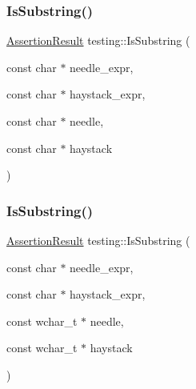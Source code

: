\mbox{\label{namespacetesting_a390c4f66fe7e9098117eb77e5fffa4ad}} 
\subsubsection{\texorpdfstring{Is\+Substring()}{IsSubstring()}\hspace{0.1cm}{\footnotesize\ttfamily [1/3]}}
{\footnotesize\ttfamily \hyperlink{classtesting_1_1_assertion_result}{Assertion\+Result} testing\+::\+Is\+Substring (\begin{DoxyParamCaption}\item[{const char $\ast$}]{needle\+\_\+expr,  }\item[{const char $\ast$}]{haystack\+\_\+expr,  }\item[{const char $\ast$}]{needle,  }\item[{const char $\ast$}]{haystack }\end{DoxyParamCaption})}

\mbox{\label{namespacetesting_aa1c82529c7591d2a9fd016de45dd9113}} 
\subsubsection{\texorpdfstring{Is\+Substring()}{IsSubstring()}\hspace{0.1cm}{\footnotesize\ttfamily [2/3]}}
{\footnotesize\ttfamily \hyperlink{classtesting_1_1_assertion_result}{Assertion\+Result} testing\+::\+Is\+Substring (\begin{DoxyParamCaption}\item[{const char $\ast$}]{needle\+\_\+expr,  }\item[{const char $\ast$}]{haystack\+\_\+expr,  }\item[{const wchar\+\_\+t $\ast$}]{needle,  }\item[{const wchar\+\_\+t $\ast$}]{haystack }\end{DoxyParamCaption})}

\mbox{\label{namespacetesting_a571c7edcfc574269833ebe3e7d338ec5}} 
